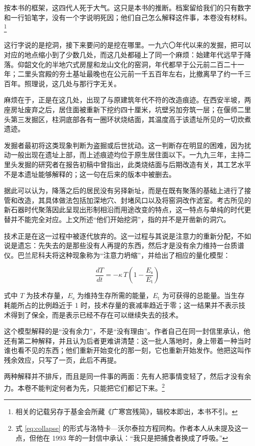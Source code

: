 按本书的框架，这四代人死于大气。这只是本书的推断。档案留给我们的只有数字和一行铅笔字，没有一个字说明死因；他们自己怎么解释这件事，本卷没有材料。\footnote{相关的记载另存于基金会所藏《广寒宫残简》，辑校本即出，本书不引。}

这行字说的是挖洞，接下来要问的是挖在哪里。一九六〇年代以来的发掘，把可以对应的地点缩小到了少数几处，而这几处都碰上了同一个麻烦：始建年代远早于降落。仰韶文化的半地穴式房屋和龙山文化的窑洞，年代都早于公元前二百二十一年；二里头宫殿的夯土基址最晚也在公元前一千五百年左右，比撤离早了约一千三百年。照理说，这几处与那行字无关。

麻烦在于，正是在这几处，出现了与原建筑年代不符的改造痕迹。在西安半坡，两座房址废弃之后，居住面被重新下挖约四十厘米，坑壁另加夯筑一层；在偃师二里头第三发掘区，柱洞底部各有一圈环状烧结面，其温度高于该遗址所见的一切炊煮遗迹。

发掘者最初将这类现象判断为盗掘或后世扰动。这一判断存在明显的困难，因为扰动一般出现在遗址上部，而上述痕迹均位于原生居住面以下。一九九三年，主持二里头发掘的研究者在报告初稿中曾指出，此类烧结面与后期改造有关，其工艺水平不是本遗址能够解释的；这一句在后来的版本中被删去。

据此可以认为，降落之后的居民没有另择新址，而是在既有聚落的基础上进行了接管和改造，其具体做法包括加深地穴、封堵风口以及将窑洞改作滤室。考古所见的新石器时代聚落因此呈现出形制相沿而用途改变的特点，这一特点与单纯的时代更替并不能完全对应。上文所述“他们开始挖洞”，指的并不是开凿新的洞穴。

技术正是在这一过程中被逐代放弃的。这一过程与其说是注意力的重新分配，不如说是遗忘：先失去的是那些没有人再提的东西，然后才是没有余力维持一台质谱仪。巴兰尼科夫将这种现象称为“注意力坍缩”，并给出了相应的量化模型：

\begin{equation}
\frac{dT}{dt} = -\kappa \, T \left(1 - \frac{E_{\mathrm{s}}}{E_{\mathrm{t}}}\right)
\label{eq:collapse}
\end{equation}

式中 $T$ 为技术存量，$E_{\mathrm{s}}$ 为维持生存所需的能量，$E_{\mathrm{t}}$ 为可获得的总能量。当生存耗能所占的比例趋近于 1 时，技术存量的衰减率趋近于零；这一结果并不表示技术得到了保全，而是表示已经不存在可以继续失去的技术。

这个模型解释的是“没有余力”，不是“没有理由”。作者自己在同一封信里承认，他还有第二种解释，并且认为后者更难讲清楚：这一批人落地时，身上带着一种当时谁也看不见的东西；他们重新开始变化的那一刻，它也重新开始发作。他把这叫作残余效应，只写了一页，此后不再提。

两种解释并不排斥，而且是同一件事的两面：先有人把事情变轻了，然后才没有余力。本卷不能判定何者为先，只能把它们都记下来。\footnote{式 \eqref{eq:collapse} 的形式与洛特卡—沃尔泰拉方程同构。作者本人从未提及这一点，但他在 1993 年的一封信中承认：“我只是把捕食者换成了呼吸。”}


